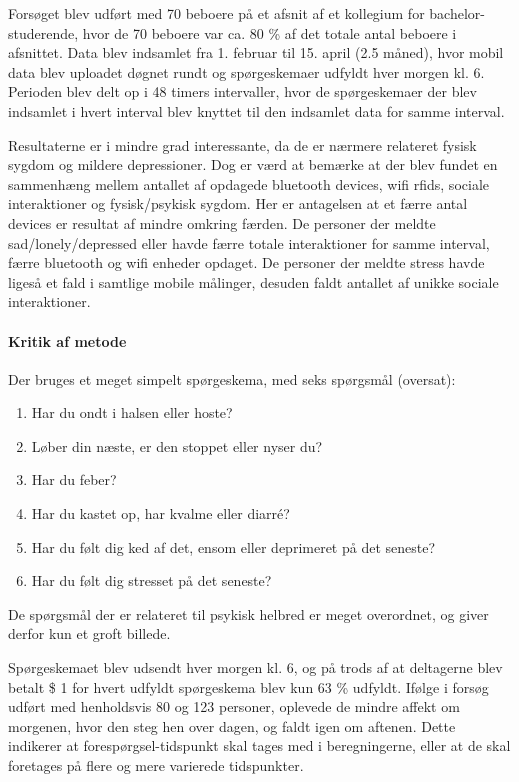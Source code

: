 Forsøget blev udført med 70 beboere på et afsnit af et kollegium for bachelor-studerende, hvor de 70 beboere var ca. 80 \% af det totale antal beboere i afsnittet.
Data blev indsamlet fra 1. februar til 15. april (2.5 måned), hvor mobil data blev uploadet døgnet rundt og spørgeskemaer udfyldt hver morgen kl. 6.
Perioden blev delt op i 48 timers intervaller, hvor de spørgeskemaer der blev indsamlet i hvert interval blev knyttet til den indsamlet data for samme interval.

Resultaterne er i mindre grad interessante, da de er nærmere relateret fysisk sygdom og mildere depressioner.
Dog er værd at bemærke at der blev fundet en sammenhæng mellem antallet af opdagede bluetooth devices, wifi rfids, sociale interaktioner og fysisk/psykisk sygdom.
Her er antagelsen at et færre antal devices er resultat af mindre omkring færden.
De personer der meldte sad/lonely/depressed eller havde færre totale interaktioner for samme interval, færre bluetooth og wifi enheder opdaget.
De personer der meldte stress havde ligeså et fald i samtlige mobile målinger, desuden faldt antallet af unikke sociale interaktioner.

\paragraph{Kritik af metode}
Der bruges et meget simpelt spørgeskema, med seks spørgsmål (oversat):
\begin{enumerate}
\item Har du ondt i halsen eller hoste?
\item Løber din næste, er den stoppet eller nyser du?
\item Har du feber?
\item Har du kastet op, har kvalme eller diarré?
\item Har du følt dig ked af det, ensom eller deprimeret på det seneste?
\item Har du følt dig stresset på det seneste?
\end{enumerate}

De spørgsmål der er relateret til psykisk helbred er meget overordnet, og giver derfor kun et groft billede.

Spørgeskemaet blev udsendt hver morgen kl. 6, og på trods af at deltagerne blev betalt \$ 1 for hvert udfyldt spørgeskema blev kun 63 \% udfyldt.
Ifølge \citet{panas} i forsøg udført med henholdsvis 80 og 123 personer, oplevede de mindre affekt om morgenen, hvor den steg hen over dagen, og faldt igen om aftenen.
Dette indikerer at forespørgsel-tidspunkt skal tages med i beregningerne, eller at de skal foretages på flere og mere varierede tidspunkter.

